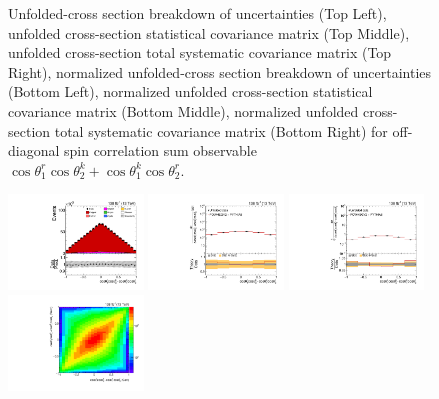\begin{figure}[htb]
\begin{center}
\caption{Unfolded-cross section breakdown of uncertainties (Top Left), unfolded cross-section statistical covariance matrix (Top Middle), unfolded cross-section total systematic covariance matrix (Top Right), normalized unfolded-cross section breakdown of uncertainties (Bottom Left), normalized unfolded cross-section statistical covariance matrix (Bottom Middle), normalized unfolded cross-section total systematic covariance matrix (Bottom Right) for off-diagonal spin correlation sum observable $\cos\theta_{1}^{r}\cos\theta_{2}^{k}+\cos\theta_{1}^{k}\cos\theta_{2}^{r}$.}
\label{fig:c_Prk_uncertainties}
\end{center}
\end{figure}
\clearpage
\begin{figure}[htb]
\begin{center}
 \includegraphics[width=0.32\textwidth]{fig_fullRun2UL/controlplots/combined/Hyp_LLBarCMrk.pdf}
 \includegraphics[width=0.32\textwidth]{fig_fullRun2UL/unfolding/combined/UnfoldedResults_c_Mrk.pdf}
 \includegraphics[width=0.32\textwidth]{fig_fullRun2UL/unfolding/combined/UnfoldedResultsNorm_c_Mrk.pdf} \\
 \includegraphics[width=0.32\textwidth]{fig_fullRun2UL/unfolding/combined/ResponseMatrix_c_Mrk.pdf}

\end{center}
\end{figure}
